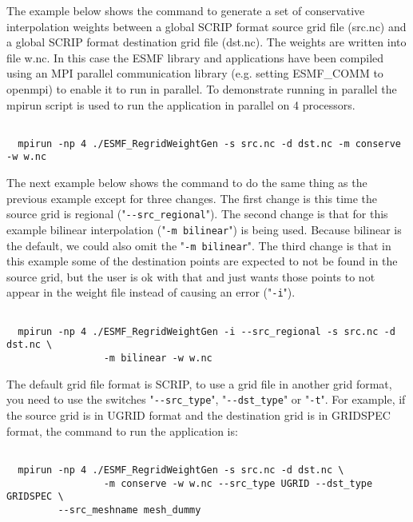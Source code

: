 The example below shows the command to generate a set of conservative interpolation weights between a global
SCRIP format source grid file (src.nc) and a global SCRIP format destination grid file (dst.nc). The weights
are written into file w.nc. In this case the
ESMF library and applications have been compiled using an MPI parallel communication library
(e.g. setting ESMF\_COMM to openmpi) to enable it to run in parallel. To demonstrate running in parallel
the mpirun script is used to run the application in parallel on 4 processors.

\begin{verbatim}

  mpirun -np 4 ./ESMF_RegridWeightGen -s src.nc -d dst.nc -m conserve -w w.nc

\end{verbatim}

The next example below shows the command to do the same thing as the previous example except for three changes. The first
change is this time the source grid is regional ("{\tt \verb+--+src\_regional}"). The second change is that
for this example bilinear interpolation ("{\tt -m bilinear}") is being used. Because bilinear is the default, we could also
omit the "{\tt -m bilinear}". The third change is that in this example some of the destination points are expected to
not be found in the source grid, but the user is ok with that and just wants those points to not appear in the weight file instead of causing an error ("{\tt -i}").

\begin{verbatim}

  mpirun -np 4 ./ESMF_RegridWeightGen -i --src_regional -s src.nc -d dst.nc \
                 -m bilinear -w w.nc

\end{verbatim}

The default grid file format is SCRIP, to use a grid file in another grid format, you
need to use the switches "{\tt \verb+--+src\_type}", "{\tt \verb+--+dst\_type}" or "{\tt -t}".  For example, if the
source grid is in UGRID format and the destination grid is in GRIDSPEC format, the command
to run the application is:

\begin{verbatim}

  mpirun -np 4 ./ESMF_RegridWeightGen -s src.nc -d dst.nc \
                 -m conserve -w w.nc --src_type UGRID --dst_type GRIDSPEC \
		 --src_meshname mesh_dummy

\end{verbatim}

